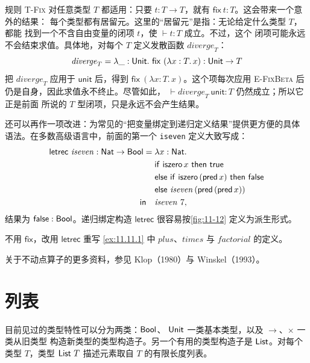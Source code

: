 规则 \textsc{T-Fix} 对任意类型 \(T\) 都适用：只要
\(t:T\to T\)，就有 \(\mathsf{fix}\ t:T\)。这会带来一个意外的结果：
每个类型都有居留元。这里的“居留元”是指：无论给定什么类型 \(T\)，都能
找到一个不含自由变量的闭项 \(t\)，使 \(\vdash t:T\) 成立。不过，这个
闭项可能永远不会结束求值。具体地，对每个 \(T\) 定义发散函数
\(\mathit{diverge}_T\)：
\[
\mathit{diverge}_T=
\lambda\_:\mathsf{Unit}.\
\mathsf{fix}\ (\lambda x:T.\,x)
:\mathsf{Unit}\to T
\]
把 \(\mathit{diverge}_T\) 应用于 \(\mathsf{unit}\) 后，得到
\(\mathsf{fix}\ (\lambda x:T.\,x)\)。这个项每次应用
\textsc{E-FixBeta} 后仍是自身，因此求值永不终止。尽管如此，
\(\vdash\mathit{diverge}_T\ \mathsf{unit}:T\) 仍然成立；所以它正是前面
所说的 \(T\) 型闭项，只是永远不会产生结果。

还可以再作一项改进：为常见的“把变量绑定到递归定义结果”提供更方便的具体
语法。在多数高级语言中，前面的第一个 \texttt{iseven} 定义大致写成：
\[
\begin{aligned}
\mathsf{letrec}\ \mathit{iseven}:
\mathsf{Nat}\to\mathsf{Bool}={}&
\lambda x:\mathsf{Nat}.\\
&\mathsf{if}\ \mathsf{iszero}\,x\ \mathsf{then}\ \mathsf{true}\\
&\mathsf{else\ if}\ \mathsf{iszero}\,(\mathsf{pred}\,x)\
 \mathsf{then}\ \mathsf{false}\\
&\mathsf{else}\ \mathit{iseven}\,
(\mathsf{pred}\,(\mathsf{pred}\,x))\\
\mathsf{in}\quad&\mathit{iseven}\ 7,
\end{aligned}
\]
结果为 \(\mathsf{false}:\mathsf{Bool}\)。递归绑定构造
\(\mathsf{letrec}\) 很容易按\cref{fig:11-12} 定义为派生形式。

\begin{exercise}[\(\star\)]
\label{ex:11.11.2}
不用 \(\mathsf{fix}\)，改用 \(\mathsf{letrec}\) 重写
\cref{ex:11.11.1} 中 \(\mathit{plus}\)、\(\mathit{times}\) 与
\(\mathit{factorial}\) 的定义。
\end{exercise}

关于不动点算子的更多资料，参见 Klop（1980）与 Winskel（1993）。

\section{列表}
\label{sec:11.12}

目前见过的类型特性可以分为两类：\(\mathsf{Bool}\)、
\(\mathsf{Unit}\) 一类基本类型，以及 \(\to\)、\(\times\) 一类从旧类型
构造新类型的类型构造子。另一个有用的类型构造子是
\(\mathsf{List}\)。对每个类型 \(T\)，类型 \(\mathsf{List}\ T\)
描述元素取自 \(T\) 的有限长度列表。

